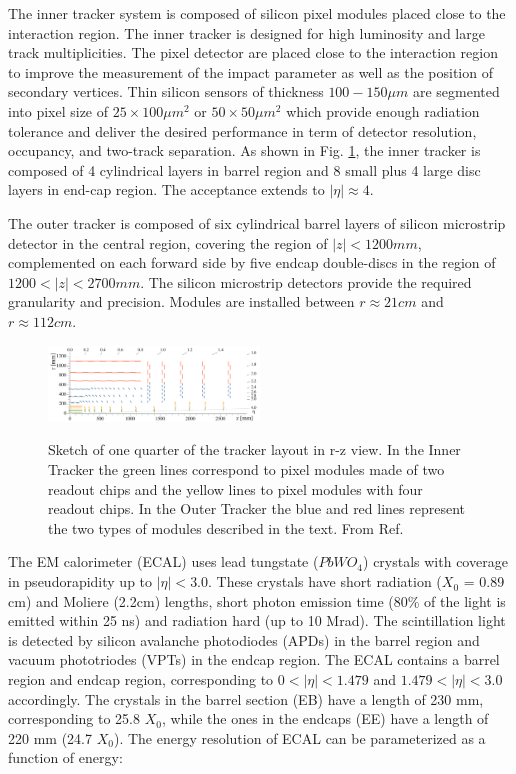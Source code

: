 The inner tracker system is composed of silicon pixel modules placed close to the interaction region. The inner tracker is designed for high luminosity and large track multiplicities. The pixel detector are placed close to the interaction region to improve the measurement of the impact parameter as well as the position of secondary vertices. Thin silicon sensors of thickness $100-150\mu m$ are segmented into pixel size of $25 \times 100 \mu m^2$ or $50 \times 50 \mu m^2$ which provide enough radiation tolerance and deliver the desired performance in term of detector resolution, occupancy, and two-track separation. As shown in Fig. \ref{fig:tracker}, the inner tracker is composed of 4 cylindrical layers in barrel region and 8 small plus 4 large disc layers in end-cap region. The acceptance extends to  $|\eta| \approx 4$. 

The outer tracker is composed of six cylindrical barrel layers of silicon microstrip detector in the central region, covering the region of $|z|<1200mm$, complemented on each forward side by five endcap double-discs in the region of $1200 < |z| < 2700mm$. The silicon microstrip detectors provide the required granularity and precision. Modules are installed between $r \approx 21cm$ and $r \approx 112cm$. 

\begin{figure}[!h]
    \centering
    \caption{Sketch of one quarter of the tracker layout in r-z view. In the Inner Tracker the green lines correspond to pixel modules made of two readout chips and the yellow lines to pixel modules with four readout chips. In the Outer Tracker the blue and red lines represent the two types of modules described in the text. From Ref.\cite{collaboration2017phase}}
    \includegraphics[width=0.5\textwidth]{fig/tracker.png}
    \label{fig:tracker}
\end{figure}

The EM calorimeter (ECAL) uses lead tungstate ($PbWO_4$) crystals with coverage in pseudorapidity up to $|\eta| < 3.0$. These crystals have short radiation ($X_0$ = 0.89 cm) and Moliere (2.2cm) lengths, short photon emission time ($80\%$ of the light is emitted within 25 ns) and radiation hard (up to 10 Mrad). The scintillation light is detected by silicon avalanche photodiodes (APDs) in the barrel region and vacuum phototriodes (VPTs) in the endcap region. The ECAL contains a barrel region and endcap region, corresponding to $0 < |\eta| < 1.479$ and $1.479 < |\eta| < 3.0$ accordingly. The crystals in the barrel section (EB) have a length of 230 mm, corresponding to 25.8 $X_0$, while the ones in the endcaps (EE) have a length of 220 mm (24.7 $X_0$). The energy resolution of ECAL can be parameterized as a function of energy: 

